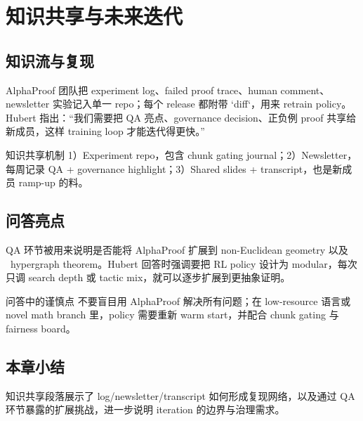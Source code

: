 \section{知识共享与未来迭代}

\subsection{知识流与复现}
AlphaProof 团队把 experiment log、failed proof trace、human comment、newsletter 实验记入单一 repo；每个 release 都附带 `diff`，用来 retrain policy。Hubert 指出：“我们需要把 QA 亮点、governance decision、正负例 proof 共享给新成员，这样 training loop 才能迭代得更快。”
\begin{importantbox}{知识共享机制}
1）Experiment repo，包含 chunk gating journal；2）Newsletter，每周记录 QA + governance highlight；3）Shared slides + transcript，也是新成员 ramp-up 的料。
\end{importantbox}

\subsection{问答亮点}
QA 环节被用来说明是否能将 AlphaProof 扩展到 non-Euclidean geometry 以及 ~hypergraph theorem。Hubert 回答时强调要把 RL policy 设计为 modular，每次只调 search depth 或 tactic mix，就可以逐步扩展到更抽象证明。
\begin{warningbox}{问答中的谨慎点}
不要盲目用 AlphaProof 解决所有问题；在 low-resource 语言或 novel math branch 里，policy 需要重新 warm start，并配合 chunk gating 与 fairness board。
\end{warningbox}

\subsection{本章小结}
知识共享段落展示了 log/newsletter/transcript 如何形成复现网络，以及通过 QA 环节暴露的扩展挑战，进一步说明 iteration 的边界与治理需求。
\newpage

